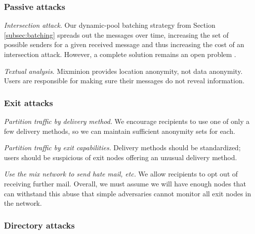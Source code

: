 \documentclass[11pt]{IEEEtran}
\begin{document}
\subsubsection{Passive attacks}
\label{subsec:passive-attacks}

\begin{description}
\item \emph{Intersection attack.} Our dynamic-pool batching strategy
from Section \ref{subsec:batching} spreads out the messages over time,
increasing the set of possible senders for a given received message and
thus increasing the cost of an intersection attack. However, a complete
solution remains an open problem \cite{langos02}.
\item \emph{Textual analysis.} Mixminion provides location anonymity,
not data anonymity. Users are responsible for making sure their messages
do not reveal information.
\end{description}

\subsubsection{Exit attacks}
\label{subsec:attacks-exitbased}

\begin{description}
\item \emph{Partition traffic by delivery method.} We encourage recipients
to use one of only a few delivery methods, so we can maintain sufficient
anonymity sets for each.
\item \emph{Partition traffic by exit capabilities.}
Delivery methods should be standardized; users should be suspicious of
exit nodes offering an unusual delivery method.
\item \emph{Use the mix network to send hate mail, etc.} We allow
recipients to opt out of receiving further mail. Overall, we must assume
we will have enough nodes that can withstand this abuse that simple
adversaries cannot monitor all exit nodes in the network.
\end{description}

\subsubsection{Directory attacks}
\label{subsec:attacks-dirbased}
\end{document}
